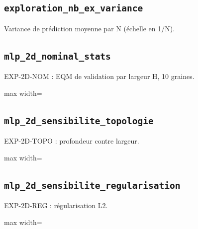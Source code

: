 \documentclass[a4paper,10pt]{article}
\newcommand{\tablesroot}{results/tables}
\begin{document}
\noindent\begin{minipage}{\linewidth}
\subsection*{\texttt{exploration\_nb\_ex\_variance}}
Variance de pr\'ediction moyenne par N (\'echelle en 1/N).
\par
\end{minipage}\par
\addtocounter{table}{-1}
\begingroup\footnotesize

\endgroup
\par\medskip

\noindent\begin{minipage}{\linewidth}
\subsection*{\texttt{mlp\_2d\_nominal\_stats}}
EXP-2D-NOM : EQM de validation par largeur H, 10 graines.
\par
\begingroup\centering\footnotesize
\begin{adjustbox}{max width=\linewidth}

\end{adjustbox}\par
\endgroup
\end{minipage}
\par\medskip

\noindent\begin{minipage}{\linewidth}
\subsection*{\texttt{mlp\_2d\_sensibilite\_topologie}}
EXP-2D-TOPO : profondeur contre largeur.
\par
\begingroup\centering\footnotesize
\begin{adjustbox}{max width=\linewidth}

\end{adjustbox}\par
\endgroup
\end{minipage}
\par\medskip

\noindent\begin{minipage}{\linewidth}
\subsection*{\texttt{mlp\_2d\_sensibilite\_regularisation}}
EXP-2D-REG : r\'egularisation L2.
\par
\begingroup\centering\footnotesize
\begin{adjustbox}{max width=\linewidth}

\end{adjustbox}\par
\endgroup
\end{minipage}
\par\medskip
\end{document}
